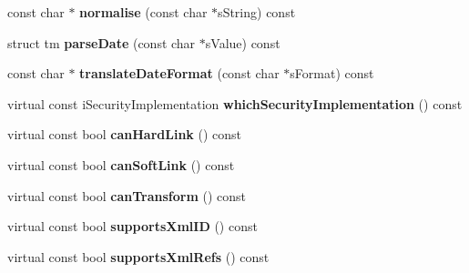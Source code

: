 \begin{DoxyCompactItemize}
\item 
\hypertarget{classgeneral__server_1_1XmlLibrary_a0997af64ed90a5a80d88cc504bcfd35e}{const char $\ast$ {\bfseries normalise} (const char $\ast$s\-String) const }\label{classgeneral__server_1_1XmlLibrary_a0997af64ed90a5a80d88cc504bcfd35e}

\item 
\hypertarget{classgeneral__server_1_1XmlLibrary_abe204227cfe0f262fa652cda1c3ce91e}{struct tm {\bfseries parse\-Date} (const char $\ast$s\-Value) const }\label{classgeneral__server_1_1XmlLibrary_abe204227cfe0f262fa652cda1c3ce91e}

\item 
\hypertarget{classgeneral__server_1_1XmlLibrary_aad5ccd9fe8ae3b81e6c5aa4a9cfc0109}{const char $\ast$ {\bfseries translate\-Date\-Format} (const char $\ast$s\-Format) const }\label{classgeneral__server_1_1XmlLibrary_aad5ccd9fe8ae3b81e6c5aa4a9cfc0109}

\item 
\hypertarget{classgeneral__server_1_1XmlLibrary_a47851b7d55891db833d783d03d829aa4}{virtual const \*
i\-Security\-Implementation {\bfseries which\-Security\-Implementation} () const }\label{classgeneral__server_1_1XmlLibrary_a47851b7d55891db833d783d03d829aa4}

\item 
\hypertarget{classgeneral__server_1_1XmlLibrary_a05bc5d47b00d71d3f577df96fded79dd}{virtual const bool {\bfseries can\-Hard\-Link} () const }\label{classgeneral__server_1_1XmlLibrary_a05bc5d47b00d71d3f577df96fded79dd}

\item 
\hypertarget{classgeneral__server_1_1XmlLibrary_a436f1863f0ce6262ef61f4973fa7d951}{virtual const bool {\bfseries can\-Soft\-Link} () const }\label{classgeneral__server_1_1XmlLibrary_a436f1863f0ce6262ef61f4973fa7d951}

\item 
\hypertarget{classgeneral__server_1_1XmlLibrary_af93f02a579e54a5dc88340fb9bf072d3}{virtual const bool {\bfseries can\-Transform} () const }\label{classgeneral__server_1_1XmlLibrary_af93f02a579e54a5dc88340fb9bf072d3}

\item 
\hypertarget{classgeneral__server_1_1XmlLibrary_ac18f901c33e3727488e289fc7cb39511}{virtual const bool {\bfseries supports\-Xml\-I\-D} () const }\label{classgeneral__server_1_1XmlLibrary_ac18f901c33e3727488e289fc7cb39511}

\item 
\hypertarget{classgeneral__server_1_1XmlLibrary_ad957a1f8daba7b95cd316f6a46874408}{virtual const bool {\bfseries supports\-Xml\-Refs} () const }\label{classgeneral__server_1_1XmlLibrary_ad957a1f8daba7b95cd316f6a46874408}


\end{DoxyCompactItemize}
